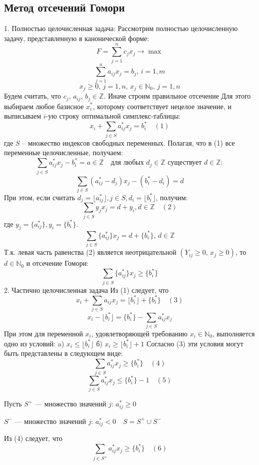 \documentclass[17pt]{extarticle}
\begin{document}
\subsection{Метод отсечений Гомори}
1. Полностью целочисленная задача:
Рассмотрим полностью целочисленную задачу, представленную в канонической форме:
\[
    F = \sum_{j=1}^{n} c_j x_j \to \max
\]
\[
    \sum_{j=1}^{n} a_{ij} x_j = b_j, \, i = 1, m
\]
\[
    x_j \geq 0, \, j = 1, n, \, x_j \in \mathbb{N}_0, \, j = 1, n
\]
Будем считать, что \( c_j, \, a_{ij}, \, b_j \in \mathbb{Z} \).
Иначе строим правильное отсечение
Для этого выбираем любое базисное \( x_i^* \), которому соответствует нецелое значение, и выписываем \( i \)-ую строку оптимальной симплекс-таблицы:
\[
    x_i + \sum_{j \in S} a_{ij}^* x_j = b_i^* \quad (1)
\]
где \( S \) – множество индексов свободных переменных.
Полагая, что в (1) все переменные целочисленные, получаем:
\[
    \sum_{j \in S} a_{ij}^* x_j - b_i^* = a \in \mathbb{Z} \quad \text{для любых } d_j \in \mathbb{Z} \text{ существует } d \in \mathbb{Z}:
\]
\[
    \sum_{j \in S} (a_{ij}^* - d_j)x_j - (b_i^* - d_i) = d
\]
При этом, если считать \( d_j = \lfloor a_{ij}^* \rfloor, j \in S, d_i = \lfloor b_i^* \rfloor \), получим:
\[
    \sum_{j \in S} y_j x_j = d + y_i, d \in \mathbb{Z} \quad (2)
\]
где \( y_j = \{a_{ij}^*\}, y_i = \{b_i^*\} \).
\[
    \sum_{j \in S} \{a_{ij}^*\} x_j = d + \{b_i^*\}, \, d \in \mathbb{Z}
\]
Т.к. левая часть равенства (2) является неотрицательной
\((Y_{ij} \geq 0, \, x_j \geq 0)\), то \(d \in \mathbb{N}_0\) и
отсечение Гомори:
\[
    \sum_{j \in S} \{a_{ij}^*\} x_j \geq \{b_i^*\}
\]
2. Частично целочисленная задача
Из (1) следует, что
\[
    x_i + \sum_{j \in S} a_{ij} x_j = \lfloor b_i^* \rfloor + \{b_i^*\} \quad (3)
\]
\[
    x_i - \lfloor b_i^* \rfloor = \{b_i^*\} - \sum_{j \in S} a_{ij}^* x_j
\]
При этом для переменной \(x_i\), удовлетворяющей требованию \(x_i \in \mathbb{N}_0\), выполняется одно из условий:
a) \(x_i \leq \lfloor b_i^* \rfloor\)
б) \(x_i \geq \lfloor b_i^* \rfloor + 1\)
Согласно (3) эти условия могут быть представлены в следующем виде:
\[
    \sum_{j \in S} a_{ij}^* x_j \geq \{b_i^*\} \quad (4)
\]
\[
    \sum_{j \in S} a_{ij}^* x_j \leq \{b_i^*\} - 1 \quad (5)
\]

Пусть \( S^+ \) — множество значений \( j \): \( a_{ij}^* \geq 0 \)

\( S^- \) — множество значений \( j \): \( a_{ij}^* < 0 \quad S = S^+ \cup S^- \)

Из (4) следует, что
\[
    \sum_{j \in S^+} a_{ij}^* x_j \geq \{b_i^*\} \quad (6)
\]
\end{document}
